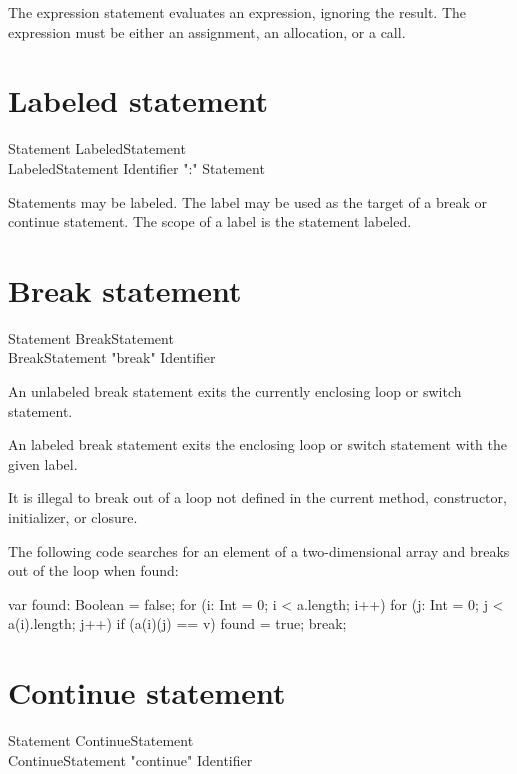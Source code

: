 The expression statement evaluates an expression, ignoring the
result.  The expression must be either an assignment, an
allocation, or a call.

\section{Labeled statement}

\begin{grammar}
Statement \: LabeledStatement \\
LabeledStatement \: Identifier \xcd":" Statement \\
\end{grammar}

Statements may be labeled.  The label may be used as the target
of a break or continue statement.  The scope of a label is the
statement labeled.

\section{Break statement}

\begin{grammar}
Statement \: BreakStatement \\
BreakStatement \: \xcd"break" Identifier\opt \\
\end{grammar}

An unlabeled break statement exits the currently enclosing loop
or switch statement.

An labeled break statement exits the enclosing loop
or switch statement with the given label.

It is illegal to break out of a loop not defined in the current
method, constructor, initializer, or closure.

The following code searches for an element of a two-dimensional
array and breaks out of the loop when found:

\begin{xten}
var found: Boolean = false;
for (i: Int = 0; i < a.length; i++)
    for (j: Int = 0; j < a(i).length; j++)
        if (a(i)(j) == v) {
            found = true;
            break;
        }
\end{xten}

\section{Continue statement}

\begin{grammar}
Statement \: ContinueStatement \\
ContinueStatement \: \xcd"continue" Identifier\opt \\
\end{grammar}


